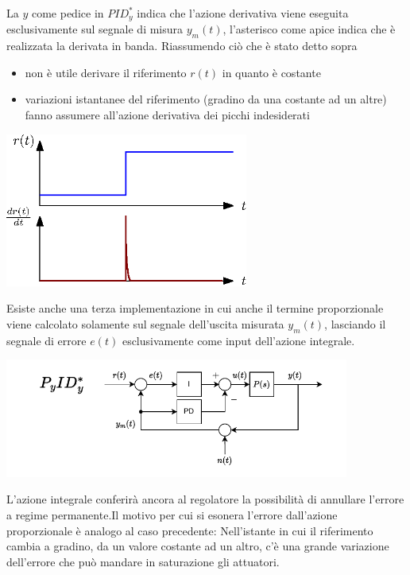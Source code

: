 \documentclass[10pt, letterpaper]{report}
\begin{document}
La $y$ come pedice in $PID_y^*$ indica che l'azione derivativa viene eseguita esclusivamente sul segnale di misura $y_m(t)$, l'asterisco come apice indica che è realizzata la derivata in banda.\acc 
Riassumendo ciò che è stato detto sopra \begin{itemize}
    \item non è utile derivare il riferimento $r(t)$ in quanto è costante
    \item variazioni istantanee del riferimento (gradino da una costante ad un altre) fanno assumere all'azione derivativa dei picchi indesiderati
\end{itemize}
\begin{center}
    \includegraphics[width=0.6\textwidth]{images/variazioneGradino.eps}
\end{center}
Esiste anche una terza implementazione in cui anche il termine proporzionale viene calcolato solamente sul segnale dell'uscita misurata $y_m(t)$, lasciando il segnale di errore $e(t)$ esclusivamente come input dell'azione integrale.\begin{center}
    \includegraphics[width=0.85\textwidth]{images/schemaPIDderivataPropUscita.pdf}
\end{center}
L'azione integrale conferirà ancora al regolatore la possibilità di annullare l'errore a regime permanente.\acc  Il motivo per cui si esonera l'errore dall'azione proporzionale è analogo al caso precedente: Nell'istante in cui il riferimento cambia a gradino, da un valore costante ad un altro, c'è una grande variazione dell'errore che può mandare in saturazione gli attuatori. 
\end{document}
